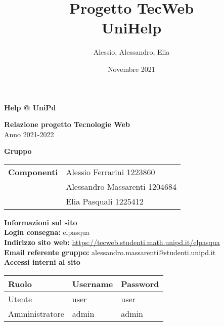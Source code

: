 \documentclass[a4paper, 11pt]{article}
\title{Progetto TecWeb \\ UniHelp}
\author{Alessio, Alessandro, Elia}
\date{Novembre 2021}
\begin{document}
\begin{center}
	\textbf{\Huge{Help @ UniPd}}\\
\end{center}

\vspace{1.5cm}

\begin{center}
	\textbf{\huge{Relazione progetto Tecnologie Web}}\\[0.2cm]
	\Large{Anno 2021-2022}
\end{center}

\vspace{5pt}

\begin{center}
	\textbf{\Large{Gruppo}}
    \begin{table}[H]
        \hspace{3.5cm}
        \renewcommand{\arraystretch}{1.4}
        \begin{tabular}{l | l}
            \textbf{Componenti} & Alessio Ferrarini 1223860\\
            & Alessandro Massarenti 1204684\\
            & Elia Pasquali 1225412\\
        \end{tabular}
    \end{table}
\end{center}

\hspace{5pt}

\begin{center}
	\textbf{\Large{Informazioni sul sito}}\\
	\textbf{Login consegna:} elpasqua \\
	\textbf{Indirizzo sito web:} \url{https://tecweb.studenti.math.unipd.it/elpasqua}\\
	\textbf{Email referente gruppo:} alessandro.massarenti@studenti.unipd.it\\
    \vspace{1cm}
    \textbf{Accessi interni al sito}
    \begin{longtable}{|l|l|l|}
        \hline
        \rowcolor[HTML]{9B0014}
        {\color[HTML]{FFFFFF} Ruolo} & {\color[HTML]{FFFFFF} Username} & {\color[HTML]{FFFFFF} Password} \\ \hline
        Utente         & user     & user     \\ \hline
        Amministratore & admin    & admin \\ \hline
    \end{longtable}
\end{center}

\pagebreak
\tableofcontents
\pagebreak







\end{document}
